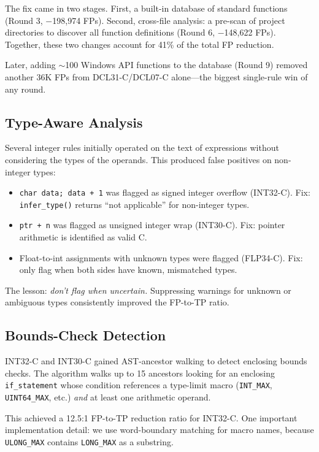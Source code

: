 The fix came in two stages.  First, a built-in database of standard
functions (Round 3, $-$198,974 FPs).  Second, cross-file analysis: a
pre-scan of project directories to discover all function definitions
(Round 6, $-$148,622 FPs).  Together, these two changes account for
41\% of the total FP reduction.

Later, adding $\sim$100 Windows API functions to the database
(Round 9) removed another 36K FPs from DCL31-C/DCL07-C alone---the
biggest single-rule win of any round.

\subsection{Type-Aware Analysis}

Several integer rules initially operated on the text of expressions
without considering the types of the operands.  This produced false
positives on non-integer types:

\begin{itemize}
    \item \texttt{char data; data + 1} was flagged as signed integer
        overflow (INT32-C).  Fix: \texttt{infer\_type()} returns
        ``not applicable'' for non-integer types.
    \item \texttt{ptr + n} was flagged as unsigned integer wrap
        (INT30-C).  Fix: pointer arithmetic is identified as valid C.
    \item Float-to-int assignments with unknown types were flagged
        (FLP34-C).  Fix: only flag when both sides have known,
        mismatched types.
\end{itemize}

The lesson: \emph{don't flag when uncertain.}  Suppressing warnings
for unknown or ambiguous types consistently improved the FP-to-TP
ratio.

\subsection{Bounds-Check Detection}

INT32-C and INT30-C gained AST-ancestor walking to detect enclosing
bounds checks.  The algorithm walks up to 15 ancestors looking for an
enclosing \texttt{if\_statement} whose condition references a type-limit
macro (\texttt{INT\_MAX}, \texttt{UINT64\_MAX}, etc.) \emph{and} at
least one arithmetic operand.

This achieved a 12.5:1 FP-to-TP reduction ratio for INT32-C.  One
important implementation detail: we use word-boundary matching for
macro names, because \texttt{ULONG\_MAX} contains \texttt{LONG\_MAX}
as a substring.

